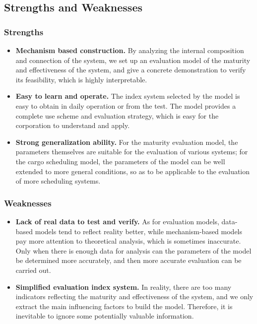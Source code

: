 \documentclass{mcmthesis}
\begin{document}
\subsection{Strengths and Weaknesses}

\subsubsection{Strengths}
\begin{itemize}
    \item \textbf{Mechanism based construction. } By analyzing the internal composition and connection of the system, we set up an evaluation model of the maturity and effectiveness of the system, and give a concrete demonstration to verify its feasibility, which is highly interpretable.
    \item \textbf{Easy to learn and operate.} The index system selected by the model is easy to obtain in daily operation or from the test. The model provides a complete use scheme and evaluation strategy, which is easy for the corporation to understand and apply.
    \item \textbf{Strong generalization ability.}  For the maturity evaluation model, the parameters themselves are suitable for the evaluation of various systems; for the cargo scheduling model, the parameters of the model can be well extended to more general conditions, so as to be applicable to the evaluation of more scheduling systems.
\end{itemize}

\subsubsection{Weaknesses}
\begin{itemize}
    \item \textbf{Lack of real data to test and verify.}  As for evaluation models, data-based models tend to reflect reality better, while mechanism-based models pay more attention to theoretical analysis, which is sometimes inaccurate. Only when there is enough data for analysis can the parameters of the model be determined more accurately, and then more accurate evaluation can be carried out.
    \item \textbf{Simplified evaluation index system.}  In reality, there are too many indicators reflecting the maturity and effectiveness of the system, and we only extract the main influencing factors to build the model. Therefore, it is inevitable to ignore some potentially valuable information.
\end{itemize}
\end{document}
